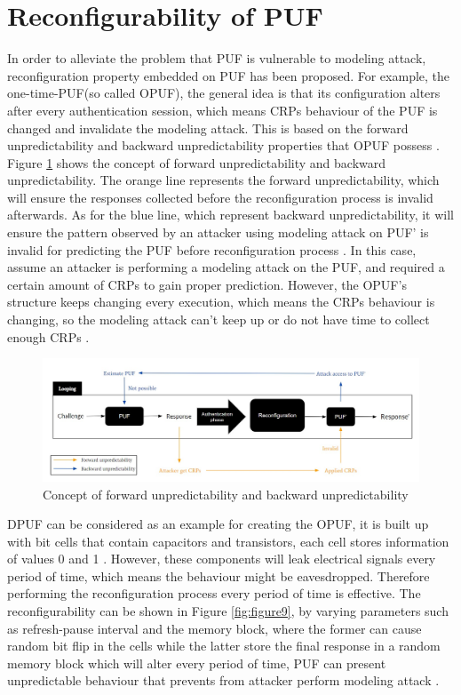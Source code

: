 \section{Reconfigurability of PUF}
In order to alleviate the problem that PUF is vulnerable to modeling attack, reconfiguration property embedded on PUF has been proposed. For example, the one-time-PUF(so called 
OPUF), the general idea is that its configuration alters after every authentication session, which means CRPs behaviour of the PUF is changed and invalidate the modeling attack. This is based on the
forward unpredictability and backward unpredictability properties that OPUF possess \cite{Reference7}. Figure \ref{fig:figure8} shows the concept of forward unpredictability and backward unpredictability.
The orange line represents the forward unpredictability, which will ensure the responses collected before the reconfiguration process is invalid afterwards. As for the blue line, 
which represent backward unpredictability, it will ensure the pattern observed by an attacker using modeling attack on PUF' is invalid for predicting the PUF before reconfiguration process \cite{Reference7}. 
In this case, assume an attacker is performing a modeling attack on the PUF, and required a certain amount of CRPs to gain proper prediction. However, the OPUF's structure keeps changing every execution, which means the CRPs 
behaviour is changing, so the modeling attack can't keep up or do not have time to collect enough CRPs \cite{Reference7}.
\begin{figure}[htp]
    \centering
    \includegraphics[width=18cm]{figures/figure8.jpg}
    \caption{Concept of forward unpredictability and backward unpredictability}
    \label{fig:figure8}
    \end{figure}

DPUF can be considered as an example for creating the OPUF, it is built up with bit cells that contain capacitors and transistors, each cell stores information of values 0 and 1 \cite{Reference7}. However, these components will leak 
electrical signals every period of time, which means the behaviour might be eavesdropped. Therefore performing the reconfiguration process every period of time is effective. The reconfigurability can be shown in Figure \ref{fig:figure9}, by varying parameters
such as refresh-pause interval and the memory block, where the former can cause random bit flip in the cells while the latter store the final response in a random memory block 
which will alter every period of time, PUF can present unpredictable behaviour that prevents from attacker perform modeling attack \cite{Reference7}.

